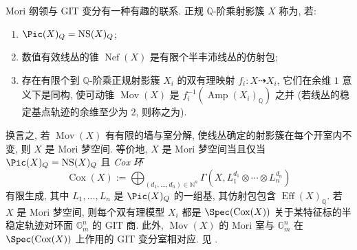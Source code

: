\begin{remark}\label{src:8.5.10}
Mori 纲领与 GIT 变分有一种有趣的联系. 正规 $\mathbb Q$-阶乘射影簇 $X$ 称为, 若:
\begin{enumerate}[(1)]
\item $\Pic(X)_{\mathbb Q}=\operatorname{NS}(X)_{\mathbb Q}$;
\item 数值有效线丛的锥 $\operatorname{Nef}(X)$ 是有限个半丰沛线丛的仿射包;
\item 存在有限个到 $\mathbb Q$-阶乘正规射影簇 $X_i$ 的双有理映射 $f_i:X\dashrightarrow X_i$, 它们在余维 $1$ 意义下是同构, 使可动锥 $\operatorname{Mov}(X)$ 是 $f_i^{-1}(\operatorname{Amp}(X_i)_{\mathbb Q})$ 之并 (若线丛的稳定基点轨迹的余维至少为 $2$, 则称之为).
\end{enumerate}
换言之, 若 $\operatorname{Mov}(X)$ 有有限的墙与室分解, 使线丛确定的射影簇在每个开室内不变, 则 $X$ 是 Mori 梦空间. 等价地, $X$ 是 Mori 梦空间当且仅当 $\Pic(X)_{\mathbb Q}=\operatorname{NS}(X)_{\mathbb Q}$ 且 \textit{Cox 环}
\[
\operatorname{Cox}(X):=\bigoplus_{(d_1,\ldots,d_n)\in\mathbb N^n}\Gamma(X,L_1^{d_1}\otimes\cdots\otimes L_n^{d_n})
\]
有限生成, 其中 $L_1,\ldots,L_n$ 是 $\Pic(X)_{\mathbb Q}$ 的一组基, 其仿射包包含 $\operatorname{Eff}(X)_{\mathbb Q}$. 若 $X$ 是 Mori 梦空间, 则每个双有理模型 $X_i$ 都是 $\Spec(\operatorname{Cox}(X))$ 关于某特征标的半稳定轨迹对环面 $\mathbb G_m^n$ 的 GIT 商. 此外, $\operatorname{Mov}(X)$ 的 Mori 室与 $\mathbb G_m^n$ 在 $\Spec(\operatorname{Cox}(X))$ 上作用的 GIT 变分室相对应. 见 \cite{HK00}.
\end{remark}
